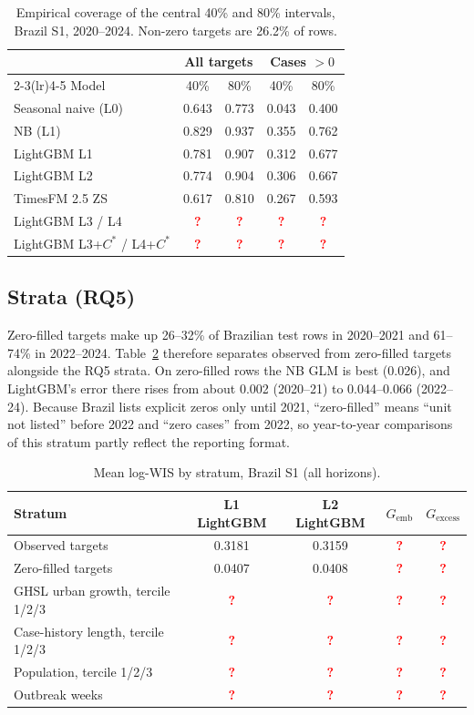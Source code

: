 \documentclass[11pt]{article}
\newcommand{\tc}{\textcolor{red}{\textbf{?}}}
\newcommand{\Gemb}{G_{\mathrm{emb}}}
\newcommand{\Gex}{G_{\mathrm{excess}}}
\newcommand{\Cstar}{C^{\ast}}
\begin{document}
\begin{table}[t]
\centering\small
\caption{Empirical coverage of the central 40\% and 80\% intervals, Brazil S1, 2020--2024.
Non-zero targets are 26.2\% of rows.}
\label{tab:coverage}
\begin{tabular}{lcccc}
\toprule
& \multicolumn{2}{c}{All targets} & \multicolumn{2}{c}{Cases $>0$} \\
\cmidrule(lr){2-3}\cmidrule(lr){4-5}
Model & 40\% & 80\% & 40\% & 80\% \\
\midrule
Seasonal naive (L0) & 0.643 & 0.773 & 0.043 & 0.400 \\
NB (L1) & 0.829 & 0.937 & 0.355 & 0.762 \\
LightGBM L1 & 0.781 & 0.907 & 0.312 & 0.677 \\
LightGBM L2 & 0.774 & 0.904 & 0.306 & 0.667 \\
TimesFM 2.5 ZS & 0.617 & 0.810 & 0.267 & 0.593 \\
LightGBM L3 / L4 & \tc & \tc & \tc & \tc \\
LightGBM L3+$\Cstar$ / L4+$\Cstar$ & \tc & \tc & \tc & \tc \\
\bottomrule
\end{tabular}
\end{table}

\subsection{Strata (RQ5)}
Zero-filled targets make up 26--32\% of Brazilian test rows in 2020--2021 and 61--74\% in 2022--2024.
Table~\ref{tab:strata} therefore separates observed from zero-filled targets alongside the RQ5 strata.
On zero-filled rows the NB GLM is best (0.026), and LightGBM's error there rises from about 0.002
(2020--21) to 0.044--0.066 (2022--24). Because Brazil lists explicit zeros only until 2021, ``zero-filled''
means ``unit not listed'' before 2022 and ``zero cases'' from 2022, so year-to-year comparisons of this
stratum partly reflect the reporting format.

\begin{table}[t]
\centering\small
\caption{Mean log-WIS by stratum, Brazil S1 (all horizons).}
\label{tab:strata}
\begin{tabular}{lcccc}
\toprule
Stratum & L1 LightGBM & L2 LightGBM & $\Gemb$ & $\Gex$ \\
\midrule
Observed targets & 0.3181 & 0.3159 & \tc & \tc \\
Zero-filled targets & 0.0407 & 0.0408 & \tc & \tc \\
GHSL urban growth, tercile 1/2/3 & \tc & \tc & \tc & \tc \\
Case-history length, tercile 1/2/3 & \tc & \tc & \tc & \tc \\
Population, tercile 1/2/3 & \tc & \tc & \tc & \tc \\
Outbreak weeks & \tc & \tc & \tc & \tc \\
\bottomrule
\end{tabular}
\end{table}
\end{document}
